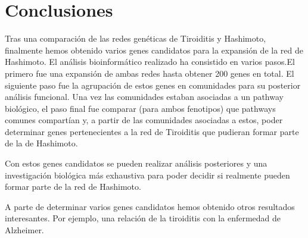 \section{Conclusiones}
Tras una comparación de las redes genéticas de Tiroiditis y Hashimoto, finalmente hemos obtenido varios genes candidatos para la expansión de la red de Hashimoto.
El análisis bioinformático realizado ha consistido en varios pasos.El primero fue una expansión de ambas redes hasta obtener 200 genes en total. El siguiente paso fue la agrupación de estos genes en comunidades para su posterior análisis funcional.
Una vez las comunidades estaban asociadas a un pathway biológico, el paso final fue comparar (para ambos fenotipos) que pathways comunes compartían y, a partir de las comunidades asociadas a estos, poder determinar genes pertenecientes a la red de Tiroiditis que pudieran formar parte de la de Hashimoto.

Con estos genes candidatos se pueden realizar análisis posteriores y una investigación biológica más exhaustiva para poder decidir si realmente pueden formar parte de la red de Hashimoto.

A parte de determinar varios genes candidatos  hemos obtenido otros resultados interesantes. Por ejemplo, una relación de la tiroiditis con la enfermedad de Alzheimer. 




